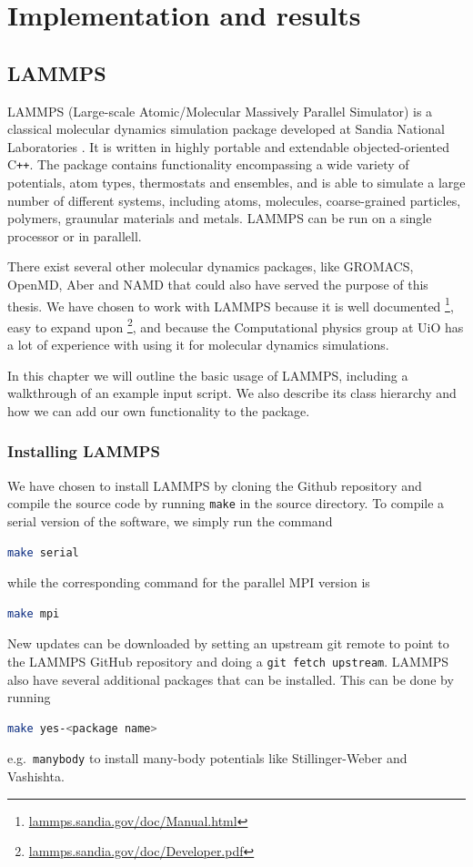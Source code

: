 \documentclass[twoside,english]{uiofysmaster}
\begin{document}
\part{Implementation and results}

\chapter{LAMMPS} \label{sec:lammps}
LAMMPS (Large-scale Atomic/Molecular Massively Parallel Simulator)
is a classical molecular dynamics simulation package 
developed at Sandia National Laboratories \cite{Plimpton95}. It is written
in highly portable and extendable objected-oriented C\texttt{++}. 
The package contains functionality encompassing a wide variety of 
potentials, atom types, thermostats and 
ensembles, and is able to simulate a large number
of different systems, including atoms, molecules, 
coarse-grained particles, polymers, graunular materials
and metals. LAMMPS can be run on a single processor
or in parallell. 

There exist several other molecular dynamics packages, 
like GROMACS, OpenMD, Aber and NAMD that could also
have served the purpose of this thesis. We have chosen
to work with LAMMPS because it is well documented%
\footnote{\href{http://lammps.sandia.gov/doc/Manual.html}{lammps.sandia.gov/doc/Manual.html}},
easy to expand upon%
\footnote{\href{http://lammps.sandia.gov/doc/Developer.pdf}{lammps.sandia.gov/doc/Developer.pdf}},
and because the Computational
physics group at UiO has a lot of experience with using
it for molecular dynamics simulations. 

In this chapter we will outline the basic usage of LAMMPS, including
a walkthrough of an example input script. We also describe its
class hierarchy and how we can add our own functionality
to the package.

\section{Installing LAMMPS}
We have chosen to install LAMMPS by cloning
the Github repository and compile the source
code by running \texttt{make} in the source directory. 
To compile a serial version of the software, we simply run
the command
\begin{lstlisting}[language=bash]
 make serial
\end{lstlisting}
while the corresponding command for the parallel
MPI version is
\begin{lstlisting}[language=bash]
 make mpi
\end{lstlisting}
New updates can be downloaded by setting an
upstream git remote to point to the LAMMPS
GitHub repository and doing a \texttt{git fetch upstream}. 
LAMMPS also have several additional packages that
can be installed. This can be done by running
\begin{lstlisting}[language=bash]
 make yes-<package name>
\end{lstlisting}
e.g.\ \texttt{manybody} to install many-body potentials
like Stillinger-Weber and Vashishta. 
\end{document}
